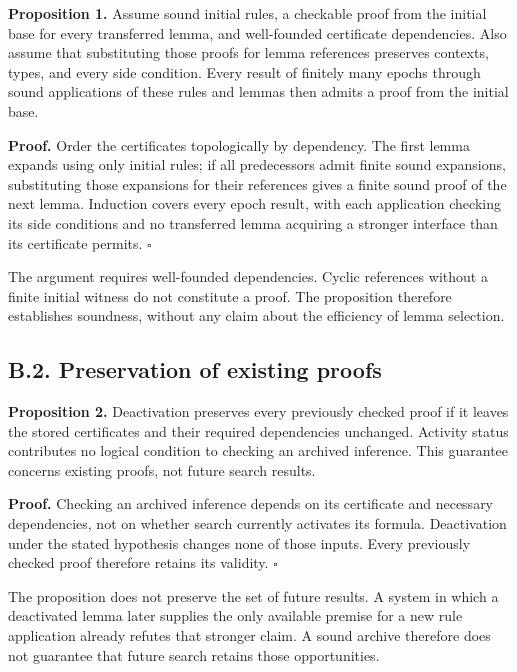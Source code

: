 \documentclass[pdflatex,sn-basic,Numbered]{sn-jnl}
\begin{document}
\textbf{Proposition 1.} Assume sound initial rules, a checkable proof from the initial base for every transferred lemma, and well-founded certificate dependencies. Also assume that substituting those proofs for lemma references preserves contexts, types, and every side condition. Every result of finitely many epochs through sound applications of these rules and lemmas then admits a proof from the initial base.

\textbf{Proof.} Order the certificates topologically by dependency. The first lemma expands using only initial rules; if all predecessors admit finite sound expansions, substituting those expansions for their references gives a finite sound proof of the next lemma. Induction covers every epoch result, with each application checking its side conditions and no transferred lemma acquiring a stronger interface than its certificate permits. \(\square\)

The argument requires well-founded dependencies. Cyclic references without a finite initial witness do not constitute a proof. The proposition therefore establishes soundness, without any claim about the efficiency of lemma selection.

\subsection*{B.2. Preservation of existing proofs}\label{b.2.-preservation-of-existing-proofs}

\textbf{Proposition 2.} Deactivation preserves every previously checked proof if it leaves the stored certificates and their required dependencies unchanged. Activity status contributes no logical condition to checking an archived inference. This guarantee concerns existing proofs, not future search results.

\textbf{Proof.} Checking an archived inference depends on its certificate and necessary dependencies, not on whether search currently activates its formula. Deactivation under the stated hypothesis changes none of those inputs. Every previously checked proof therefore retains its validity. \(\square\)

The proposition does not preserve the set of future results. A system in which a deactivated lemma later supplies the only available premise for a new rule application already refutes that stronger claim. A sound archive therefore does not guarantee that future search retains those opportunities.
\end{document}
